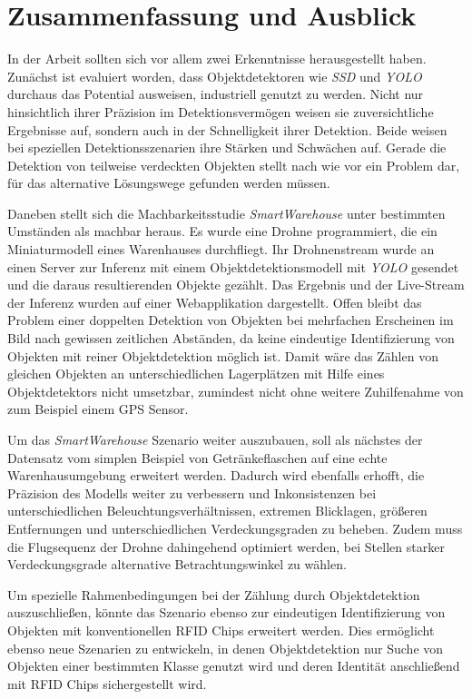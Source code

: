 \chapter{Zusammenfassung und Ausblick}

In der Arbeit sollten sich vor allem zwei Erkenntnisse herausgestellt haben. Zunächst ist evaluiert worden, dass Objektdetektoren wie \textit{SSD} und \textit{YOLO} durchaus das Potential ausweisen, industriell genutzt zu werden. Nicht nur hinsichtlich ihrer Präzision im Detektionsvermögen weisen sie zuversichtliche Ergebnisse auf, sondern auch in der Schnelligkeit ihrer Detektion. Beide weisen bei speziellen Detektionsszenarien ihre Stärken und Schwächen auf. Gerade die Detektion von teilweise verdeckten Objekten stellt nach wie vor ein Problem dar, für das alternative Lösungswege gefunden werden müssen. 

Daneben stellt sich die Machbarkeitsstudie \textit{SmartWarehouse} unter bestimmten Umständen als machbar heraus. Es wurde eine Drohne programmiert, die ein Miniaturmodell eines Warenhauses durchfliegt. Ihr Drohnenstream wurde an einen Server zur Inferenz mit einem Objektdetektionsmodell mit \textit{YOLO} gesendet und die daraus resultierenden Objekte gezählt. Das Ergebnis und der Live-Stream der Inferenz wurden auf einer Webapplikation dargestellt. Offen bleibt das Problem einer doppelten Detektion von Objekten bei mehrfachen Erscheinen im Bild nach gewissen zeitlichen Abständen, da keine eindeutige Identifizierung von Objekten mit reiner Objektdetektion möglich ist. Damit wäre das Zählen von gleichen Objekten an unterschiedlichen Lagerplätzen mit Hilfe eines Objektdetektors nicht umsetzbar, zumindest nicht ohne weitere Zuhilfenahme von zum Beispiel einem GPS Sensor.

Um das \textit{SmartWarehouse} Szenario weiter auszubauen, soll als nächstes der Datensatz vom simplen Beispiel von Getränkeflaschen auf eine echte Warenhausumgebung erweitert werden. Dadurch wird ebenfalls erhofft, die Präzision des Modells weiter zu verbessern und Inkonsistenzen bei unterschiedlichen Beleuchtungsverhältnissen, extremen Blicklagen, größeren Entfernungen und unterschiedlichen Verdeckungsgraden zu beheben. Zudem muss die Flugsequenz der Drohne dahingehend optimiert werden, bei Stellen starker Verdeckungsgrade alternative Betrachtungswinkel zu wählen. 

Um spezielle Rahmenbedingungen bei der Zählung durch Objektdetektion auszuschließen, könnte das Szenario ebenso zur eindeutigen Identifizierung von Objekten mit konventionellen RFID Chips erweitert werden. Dies ermöglicht ebenso neue Szenarien zu entwickeln, in denen Objektdetektion nur Suche von Objekten einer bestimmten Klasse genutzt wird und deren Identität anschließend mit RFID Chips sichergestellt wird. 